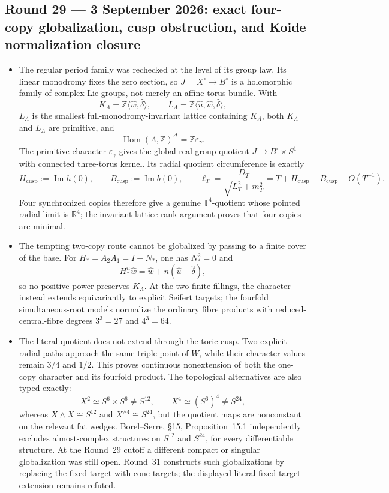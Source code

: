 \subsection*{Round 29 --- 3 September 2026: exact four-copy globalization,
cusp obstruction, and Koide normalization closure}

\begin{itemize}[leftmargin=1.8em]
\item The regular period family was rechecked at the level of its group law.
Its linear monodromy fixes the zero section, so
\(J=X^\circ\to B^\circ\) is a holomorphic family of complex Lie groups,
not merely an affine torus bundle.  With
\[
 K_\Lambda=\mathbb Z\langle\widehat w,\widehat\delta\rangle,
 \qquad
 L_\Lambda=\mathbb Z\langle\widehat u,
                    \widehat w,\widehat\delta\rangle,
\]
\(L_\Lambda\) is the smallest full-monodromy-invariant lattice containing
\(K_\Lambda\), both \(K_\Lambda\) and \(L_\Lambda\) are primitive, and
\[
 \operatorname{Hom}(\Lambda,\mathbb Z)^\Delta
 =\mathbb Z\varepsilon_\gamma.
\]
The primitive character \(\varepsilon_\gamma\) gives the global real group
quotient \(J\to B^\circ\times S^1\) with connected three-torus kernel.  Its
radial quotient circumference is exactly
\[
 H_{\mathrm{cusp}}:=\operatorname{Im}h(0),\qquad
 B_{\mathrm{cusp}}:=\operatorname{Im}b(0),
 \qquad
 \ell_T=\frac{D_T}{\sqrt{L_T^2+m_T^2}}
       =T+H_{\mathrm{cusp}}-B_{\mathrm{cusp}}+O(T^{-1}).
\]
Four synchronized copies therefore give a genuine \(\mathbb T^4\)-quotient
whose pointed radial limit is \(\mathbb R^4\); the invariant-lattice rank
argument proves that four copies are minimal.

\item The tempting two-copy route cannot be globalized by passing to a finite
cover of the base.  For \(H_*=A_2A_1=I+N_*\), one has \(N_*^2=0\) and
\[
 H_*^n\widehat w
 =\widehat w+n(\widehat u-\widehat\delta),
\]
so no positive power preserves \(K_\Lambda\).  At the two finite fillings,
the character instead extends equivariantly to explicit Seifert targets;
the fourfold simultaneous-root models normalize the ordinary fibre products
with reduced-central-fibre degrees \(3^3=27\) and \(4^3=64\).

\item The literal quotient does not extend through the toric cusp.  Two
explicit radial paths approach the same triple point of \(W\), while their
character values remain \(3/4\) and \(1/2\).  This proves continuous
nonextension of both the one-copy character and its fourfold product.  The
topological alternatives are also typed exactly:
\[
 X^2\simeq S^6\times S^6\ne S^{12},\qquad
 X^4\simeq(S^6)^4\ne S^{24},
\]
whereas \(X\wedge X\cong S^{12}\) and
\(X^{\wedge4}\cong S^{24}\), but the quotient maps are nonconstant on the
relevant fat wedges.  Borel--Serre, \S15, Proposition~15.1 independently
excludes almost-complex structures on \(S^{12}\) and \(S^{24}\), for every
differentiable structure.  At the Round~29 cutoff a different compact or
singular globalization was still open.  Round~31 constructs such
globalizations by replacing the fixed target with cone targets; the
displayed literal fixed-target extension remains refuted.


\end{itemize}
